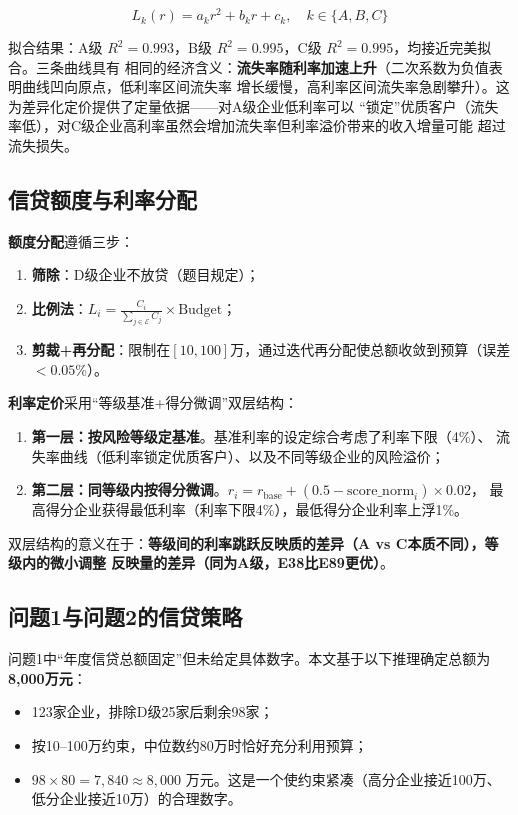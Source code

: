 \documentclass[12pt,a4paper]{ctexart}
\begin{document}
\begin{equation}
L_k(r) = a_k r^2 + b_k r + c_k, \quad k \in \{A,B,C\}
\end{equation}

拟合结果：A级 $R^2=0.993$，B级 $R^2=0.995$，C级 $R^2=0.995$，均接近完美拟合。三条曲线具有
相同的经济含义：\textbf{流失率随利率加速上升}（二次系数为负值表明曲线凹向原点，低利率区间流失率
增长缓慢，高利率区间流失率急剧攀升）。这为差异化定价提供了定量依据——对A级企业低利率可以
``锁定''优质客户（流失率低），对C级企业高利率虽然会增加流失率但利率溢价带来的收入增量可能
超过流失损失。

\subsection{信贷额度与利率分配}

\textbf{额度分配}遵循三步：
\begin{enumerate}
    \item \textbf{筛除}：D级企业不放贷（题目规定）；
    \item \textbf{比例法}：$L_i = \frac{C_i}{\sum_{j\in\mathcal{E}} C_j} \times \text{Budget}$；
    \item \textbf{剪裁+再分配}：限制在$[10,100]$万，通过迭代再分配使总额收敛到预算（误差$<0.05\%$）。
\end{enumerate}

\textbf{利率定价}采用``等级基准+得分微调''双层结构：
\begin{enumerate}
    \item \textbf{第一层：按风险等级定基准}。基准利率的设定综合考虑了利率下限（4\%）、
          流失率曲线（低利率锁定优质客户）、以及不同等级企业的风险溢价；
    \item \textbf{第二层：同等级内按得分微调}。$r_i = r_{\text{base}} + (0.5 - \text{score\_norm}_i) \times 0.02$，
          最高得分企业获得最低利率（利率下限4\%），最低得分企业利率上浮1\%。
\end{enumerate}

双层结构的意义在于：\textbf{等级间的利率跳跃反映质的差异（A vs C本质不同），等级内的微小调整
反映量的差异（同为A级，E38比E89更优）}。

\subsection{问题1与问题2的信贷策略}

问题1中``年度信贷总额固定''但未给定具体数字。本文基于以下推理确定总额为\textbf{8,000万元}：
\begin{itemize}
    \item 123家企业，排除D级25家后剩余98家；
    \item 按10--100万约束，中位数约80万时恰好充分利用预算；
    \item $98\times 80 = 7,840 \approx 8,000$ 万元。这是一个使约束紧凑（高分企业接近100万、
          低分企业接近10万）的合理数字。
\end{itemize}
\end{document}
